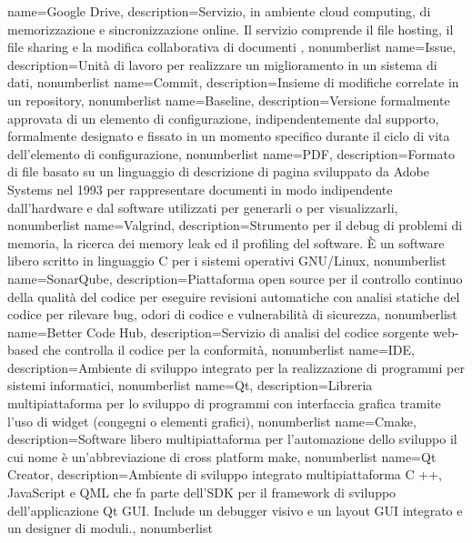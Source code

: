 {
	name={Google Drive},
	description={Servizio, in ambiente cloud computing, di memorizzazione e sincronizzazione online. Il servizio comprende il file hosting, il file sharing e la modifica collaborativa di documenti },
	nonumberlist
}
{
	name={Issue},
	description={Unità di lavoro per realizzare un miglioramento in un sistema di dati},
	nonumberlist
}
{
	name={Commit},
	description={Insieme di modifiche correlate in un repository},
	nonumberlist
}
{
	name={Baseline},
	description={Versione formalmente approvata di un elemento di configurazione, indipendentemente dal supporto, formalmente designato e fissato in un momento specifico durante il ciclo di vita dell'elemento di configurazione},
	nonumberlist
}
{
	name={PDF},
	description={Formato di file basato su un linguaggio di descrizione di pagina sviluppato da Adobe Systems nel 1993 per rappresentare documenti in modo indipendente dall'hardware e dal software utilizzati per generarli o per visualizzarli},
	nonumberlist
}
{
	name={Valgrind},
	description={Strumento per il debug di problemi di memoria, la ricerca dei memory leak ed il profiling del software. È un software libero scritto in linguaggio C per i sistemi operativi GNU/Linux},
	nonumberlist
}
{
	name={SonarQube},
	description={Piattaforma open source per il controllo continuo della qualità del codice per eseguire revisioni automatiche con analisi statiche del codice per rilevare bug, odori di codice e vulnerabilità di sicurezza},
	nonumberlist
}
{
	name={Better Code Hub},
	description={Servizio di analisi del codice sorgente web-based che controlla il codice per la conformità},
	nonumberlist
}
{
	name={IDE},
	description={Ambiente di sviluppo integrato per la realizzazione di programmi per sistemi informatici},
	nonumberlist
}
{
	name={Qt},
	description={Libreria multipiattaforma per lo sviluppo di programmi con interfaccia grafica tramite l'uso di widget (congegni o elementi grafici)},
	nonumberlist
}
{
	name={Cmake},
	description={Software libero multipiattaforma per l'automazione dello sviluppo il cui nome è un'abbreviazione di cross platform make},
	nonumberlist
}
{
	name={Qt Creator},
	description={Ambiente di sviluppo integrato multipiattaforma C ++, JavaScript e QML che fa parte dell'SDK per il framework di sviluppo dell'applicazione Qt GUI. Include un debugger visivo e un layout GUI integrato e un designer di moduli.},
	nonumberlist
}

